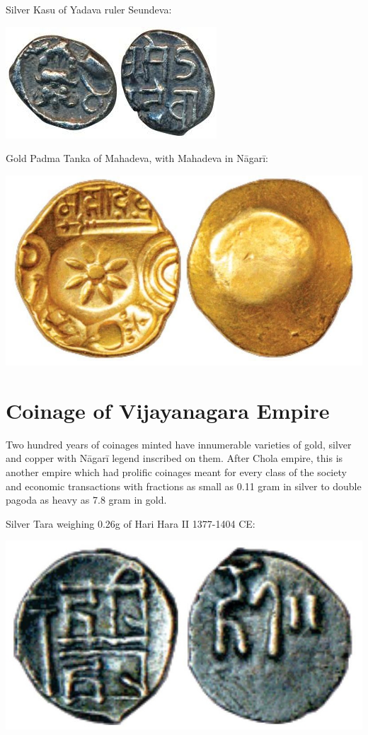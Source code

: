 Silver Kasu of Yadava ruler Seundeva:

\vskip 3pt

\centerline{\includegraphics[scale=0.7]{"images/article-06/art06-fig17.jpg"}}

Gold Padma Tanka of Mahadeva, with Mahadeva in Nāgarī:

\centerline{\includegraphics{"images/article-06/art06-fig18.jpg"}}


\section*{Coinage of Vijayanagara Empire}

Two hundred years of coinages minted have innumerable varieties of gold, silver and copper with Nāgarī legend inscribed on them. After Chola empire, this is another empire which had prolific coinages meant for every class of the society and economic transactions with fractions as small as 0.11 gram in silver to double pagoda as heavy as 7.8 gram in gold.

Silver Tara weighing 0.26g of Hari Hara II 1377-1404 CE:

\vskip 2pt

\centerline{\includegraphics[scale=0.47]{"images/article-06/art06-fig19.jpg"}}

